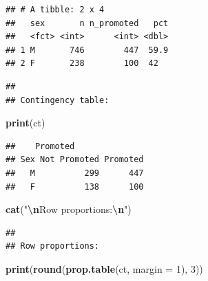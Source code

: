 \documentclass[
]{article}
\newenvironment{Shaded}{\begin{snugshade}}{\end{snugshade}}
\newcommand{\AttributeTok}[1]{\textcolor[rgb]{0.13,0.29,0.53}{#1}}
\newcommand{\DecValTok}[1]{\textcolor[rgb]{0.00,0.00,0.81}{#1}}
\newcommand{\FunctionTok}[1]{\textcolor[rgb]{0.13,0.29,0.53}{\textbf{#1}}}
\newcommand{\NormalTok}[1]{#1}
\newcommand{\OtherTok}[1]{\textcolor[rgb]{0.56,0.35,0.01}{#1}}
\newcommand{\SpecialCharTok}[1]{\textcolor[rgb]{0.81,0.36,0.00}{\textbf{#1}}}
\newcommand{\StringTok}[1]{\textcolor[rgb]{0.31,0.60,0.02}{#1}}
\begin{document}
\begin{verbatim}
## # A tibble: 2 x 4
##   sex       n n_promoted   pct
##   <fct> <int>      <int> <dbl>
## 1 M       746        447  59.9
## 2 F       238        100  42
\end{verbatim}

\begin{Shaded}
\end{Shaded}

\begin{verbatim}
## 
## Contingency table:
\end{verbatim}

\begin{Shaded}
\begin{Highlighting}[]
\FunctionTok{print}\NormalTok{(ct)}
\end{Highlighting}
\end{Shaded}

\begin{verbatim}
##    Promoted
## Sex Not Promoted Promoted
##   M          299      447
##   F          138      100
\end{verbatim}

\begin{Shaded}
\begin{Highlighting}[]
\FunctionTok{cat}\NormalTok{(}\StringTok{"}\SpecialCharTok{\textbackslash{}n}\StringTok{Row proportions:}\SpecialCharTok{\textbackslash{}n}\StringTok{"}\NormalTok{)}
\end{Highlighting}
\end{Shaded}

\begin{verbatim}
## 
## Row proportions:
\end{verbatim}

\begin{Shaded}
\begin{Highlighting}[]
\FunctionTok{print}\NormalTok{(}\FunctionTok{round}\NormalTok{(}\FunctionTok{prop.table}\NormalTok{(ct, }\AttributeTok{margin =} \DecValTok{1}\NormalTok{), }\DecValTok{3}\NormalTok{))}
\end{Highlighting}
\end{Shaded}
\end{document}
